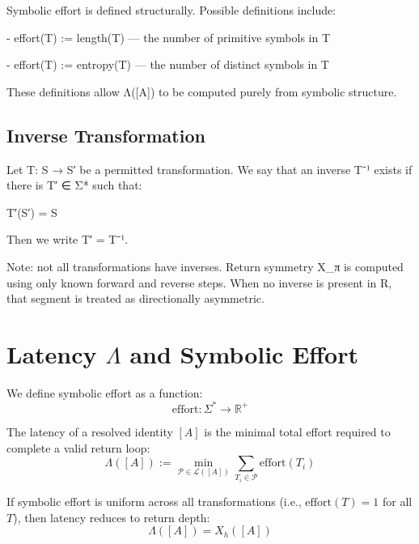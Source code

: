 Symbolic effort is defined structurally. Possible definitions include:

- effort(T) := length(T) --- the number of primitive symbols in T

- effort(T) := entropy(T) --- the number of distinct symbols in T

These definitions allow Λ({[}A{]}) to be computed purely from symbolic
structure.

\subsection{Inverse Transformation}\label{inverse-transformation}

Let T: S → S′ be a permitted transformation. We say that an inverse T⁻¹
exists if there is T′ ∈ Σ* such that:

T′(S′) = S

Then we write T′ = T⁻¹.

Note: not all transformations have inverses. Return symmetry X\_π is
computed using only known forward and reverse steps. When no inverse is
present in R, that segment is treated as directionally asymmetric.


\section{Latency $\Lambda$ and Symbolic Effort} \label{latency-lambda-and-symbolic-effort}

We define symbolic effort as a function:
\begin{equation} \label{eq:effort-function}
\text{effort} : \Sigma^* \rightarrow \mathbb{R}^+
\end{equation}

\begin{definition}[Latency] \label{def:latency}
The latency of a resolved identity $[A]$ is the minimal total effort required to complete a valid return loop:
\begin{equation} \label{eq:latency}
\Lambda([A]) := \min_{\mathcal{P} \in \mathcal{L}([A])} \sum_{T_i \in \mathcal{P}} \text{effort}(T_i)
\end{equation}
\end{definition}

If symbolic effort is uniform across all transformations (i.e., $\text{effort}(T) = 1$ for all $T$), then latency reduces to return depth:
\begin{equation} \label{eq:latency-depth-equivalence}
\Lambda([A]) = X_h([A])
\end{equation}


